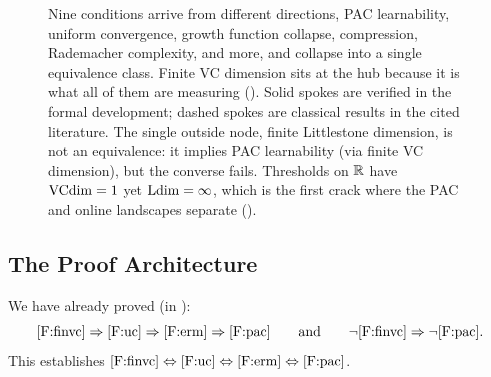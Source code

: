 \begin{figure}[ht]
\caption[The equivalence web of the Fundamental Theorem: VC dimension as the hub]{Nine conditions
arrive from different directions, PAC learnability, uniform convergence, growth function collapse,
compression, Rademacher complexity, and more, and collapse into a single equivalence class.  Finite VC
dimension sits at the hub because it is what all of them are measuring ().
Solid spokes are verified in the formal development; dashed spokes are classical results in the cited
literature.  The single outside node, finite Littlestone dimension, is not an equivalence: it implies
PAC learnability (via finite VC dimension), but the converse fails.  Thresholds on $\mathbb{R}$ have $\mathrm{VCdim}=1$
yet $\mathrm{Ldim}=\infty$, which is the first crack where the PAC and online landscapes separate
().}
\label{fig:equivalence-web}
\end{figure}


\subsection{The Proof Architecture}
\label{sec:proof-architecture}

We have already proved (in ):
\[
  \ref{F:finvc} \Rightarrow \ref{F:uc} \Rightarrow \ref{F:erm}
  \Rightarrow \ref{F:pac}
  \qquad\text{and}\qquad
  \neg\ref{F:finvc} \Rightarrow \neg\ref{F:pac}.
\]
This establishes
$\ref{F:finvc} \Leftrightarrow \ref{F:uc} \Leftrightarrow \ref{F:erm}
\Leftrightarrow \ref{F:pac}$.

